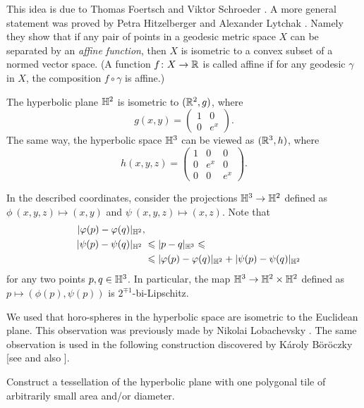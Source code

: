 This idea is due to Thomas Foertsch
and Viktor Schroeder \cite[see][]{foertsch-schroeder}.
A more general statement was proved by Petra Hitzelberger and Alexander Lytchak \cite[see][]{hitzelberger-lytchak}.
Namely they show that 
if any pair of points in a geodesic metric space $X$ can be separated by an \emph{affine function},
then $X$ is isometric to a convex subset of a normed vector space.
(A function $f\colon X\to\mathbb{R}$ is called affine if for any geodesic $\gamma$ in $X$, the composition $f\circ\gamma$ is affine.)


The hyperbolic plane $\mathbb{H}^2$ is isometric to $(\mathbb{R}^2,g)$, where 
\[g(x,y)=\left(\begin{matrix}
     1&0
     \\
     0&e^{x}
    \end{matrix}\right).\]
The same way, the hyperbolic space $\mathbb{H}^3$
can be viewed as $(\mathbb{R}^3,h)$, where 
\[h(x,y,z)=\left(\begin{matrix}
     1&0&0
     \\
     0&e^{x}&0
     \\
     0&0&e^{x}
\end{matrix}\right).\]
    
In the described coordinates, consider the projections $\mathbb{H}^3\to\mathbb{H}^2$ defined as 
$\phi\:(x,y,z)\mapsto (x,y)$ and $\psi\:(x,y,z)\mapsto (x,z)$.
Note that 
\begin{align*}
|\varphi(p)-\varphi(q)|_{\mathbb{H}^2},&
\\
\quad |\psi(p)-\psi(q)|_{\mathbb{H}^2}\hphantom{,}
&\leqslant
|p-q|_{\mathbb{H}^3}
\leqslant
\\
&\leqslant
|\varphi(p)-\varphi(q)|_{\mathbb{H}^2}+ |\psi(p)-\psi(q)|_{\mathbb{H}^2}
\end{align*}
for any two points $p,q\in \mathbb{H}^3$.
In particular, the map $\mathbb{H}^3\to\mathbb{H}^2\times\mathbb{H}^2$ defined as $p\mapsto (\phi(p),\psi(p))$
is $2^{\mp1}$-bi-Lipschitz.\qeds

We used that horo-spheres in the hyperbolic space are isometric to the Euclidean plane.
This observation was previously made by Nikolai Lobachevsky \cite[see 34 in][]{lobachevsky}.
The same observation is used in the following construction discovered by 
K\'{a}roly B\"{o}r\"{o}czky [see  and also ]. 

\begin{pr}
Construct a tessellation of the hyperbolic plane with one polygonal tile of arbitrarily small area and/or diameter.  
\end{pr}

